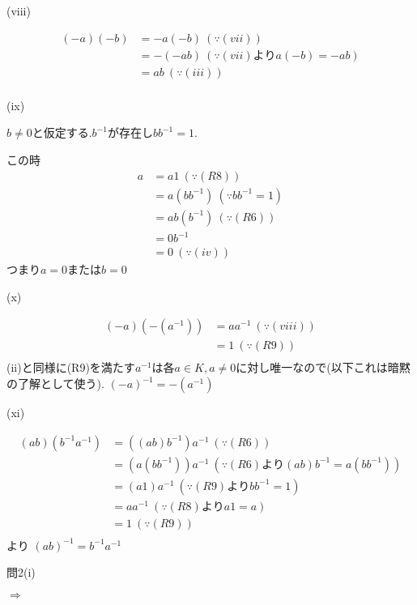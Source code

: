 \documentclass{jsarticle}
\begin{document}
       (viii)
       
       \begin{align*}
       (-a)(-b) &= -a(-b) \ (\because (vii))\\
       &= -(-ab) \ (\because (vii)よりa(-b)=-ab)\\
       &= ab \ (\because (iii))\\
       \end{align*}
       
       (ix)
       
       $b\neq 0$と仮定する.$b^{-1}$が存在し$bb^{-1}=1$.
       
       
       この時
       \begin{align*}
       a &= a1 \ (\because (R8))\\
       &= a(bb^{-1}) \ (\because bb^{-1}=1)\\
       &= ab(b^{-1}) \ (\because (R6))\\
       &= 0b^{-1}\\
       &= 0 \ (\because (iv))
       \end{align*}
       つまり$a=0$または$b=0$
       
       (x)
       
       \begin{align*}
       (-a)(-(a^{-1})) &= aa^{-1} \ (\because (viii))\\
       &= 1 \ (\because (R9))\\
       \end{align*}
       (ii)と同様に(R9)を満たす$a^{-1}$は各$a\in K,a\neq 0$に対し唯一なので(以下これは暗黙の了解として使う).
       $(-a)^{-1}=-(a^{-1})$
       
       (xi)
       
       \begin{align*}
       (ab)(b^{-1}a^{-1})&=((ab)b^{-1})a^{-1} \ (\because (R6))\\
       &=(a(bb^{-1}))a^{-1} \ (\because (R6) より(ab)b^{-1}=a(bb^{-1}))\\
       &=(a1)a^{-1} \ (\because (R9) よりbb^{-1}=1)\\
       &=aa^{-1} \ (\because (R8) よりa1=a)\\
       &=1 \ (\because (R9))\\
       \end{align*}
       より
       $(ab)^{-1}=b^{-1}a^{-1}$
       
       
       問2(i)
       
       
       $\Rightarrow$
       
\end{document}
